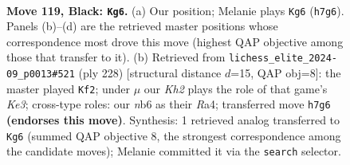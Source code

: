 \documentclass[11pt]{article}
\begin{document}
\clearpage

\begin{figure}[p]\centering
\begin{subfigure}{0.46\textwidth}\centering
\resizebox{\linewidth}{!}{%
\newchessgame
\chessboard[
  setfen={8/6pk/1N2Rp2/7p/7P/6PK/r7/8 b - - 63 119},
  showmover=false,
  pgfstyle=straightmove, color=movearrow, markmove={h7-g6}
]}
\caption{}
\end{subfigure}\hfill
\begin{subfigure}{0.46\textwidth}\centering
\resizebox{\linewidth}{!}{%
\newchessgame
\chessboard[
  setfen={8/4r3/6pk/7p/R6P/4KPP1/8/8 w - - 39 115},
  showmover=false,
  pgfstyle=straightmove, color=movearrow, markmove={e3-f2}
]}
\caption{}
\end{subfigure}
\\[4pt]

\caption{\textbf{Move 119, Black: \texttt{Kg6}.} (a) Our position; Melanie plays \texttt{Kg6} (\texttt{h7g6}). Panels (b)--(d) are the retrieved master positions whose correspondence most drove this move (highest QAP objective among those that transfer to it). (b) Retrieved from \texttt{lichess\_elite\_2024-09\_p0013\#521} (ply 228) [structural distance $d$=15, QAP obj=8]: the master played \texttt{Kf2}; under $\mu$ our \emph{Kh2} plays the role of that game's \emph{Ke3}; cross-type roles: our \emph{n}b6 as their \emph{R}a4; transferred move \texttt{h7g6} \textbf{(endorses this move)}. Synthesis: 1 retrieved analog transferred to \texttt{Kg6} (summed QAP objective 8, the strongest correspondence among the candidate moves); Melanie committed it via the \texttt{search} selector.}
\label{fig:thought-m237}
\end{figure}

\clearpage
\end{document}
